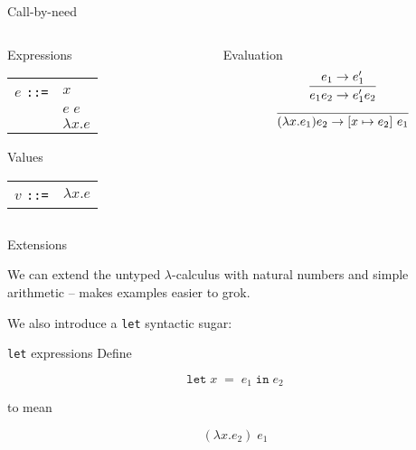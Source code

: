 %
\begin{frame}{Call-by-need}

\begin{columns}
\begin{column}{0.4\textwidth}

\begin{block}{Expressions}
\begin{tabular}{ll}
$e$ \texttt{::=} & $x$              \\
                 & $e \; e$         \\
                 & $\lambda x . e$  \\
\end{tabular}
\end{block}

\begin{block}{Values}
\begin{tabular}{ll}
$v$ \texttt{::=} & $\lambda x . e$  \\
\end{tabular}
\end{block}

\end{column}
\begin{column}{0.4\textwidth}

\begin{block}{Evaluation}
\[
\infer{e_1 e_2 \to e_1' e_2}{e_1 \to e_1'}
\]
\[
\infer{(\lambda x . e_1) e_2 \to \left[x \mapsto e_2 \right] \, e_1}{}
\]
\end{block}

\end{column}
\end{columns}

\end{frame}

%
\begin{frame}{Extensions}

We can extend the untyped $\lambda$-calculus with natural numbers and simple
arithmetic -- makes examples easier to grok.

We also introduce a \texttt{let} syntactic sugar:

\begin{block}{\texttt{let} expressions}
Define

\[
\mathtt{let} \; x \; \mathtt{=} \; e_1 \; \mathtt{in} \; e_2
\]

to mean

\[
(\lambda x . e_2) \; e_1
\]
\end{block}

\end{frame}

